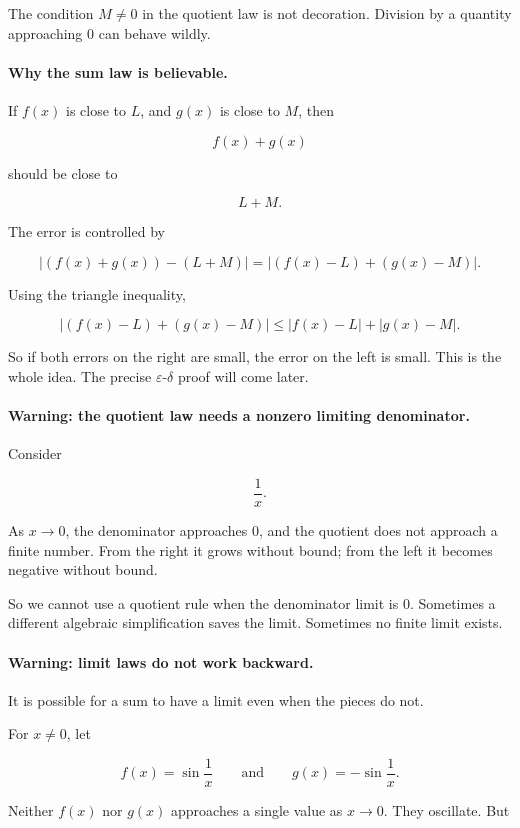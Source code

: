 The condition \(M\neq0\) in the quotient law is not decoration.  Division by a quantity approaching \(0\) can behave wildly.

\paragraph{Why the sum law is believable.}
If \(f(x)\) is close to \(L\), and \(g(x)\) is close to \(M\), then

\[
f(x)+g(x)
\]

should be close to

\[
L+M.
\]

The error is controlled by

\[
\bigl|(f(x)+g(x))-(L+M)\bigr|
=
\bigl|(f(x)-L)+(g(x)-M)\bigr|.
\]

Using the triangle inequality,

\[
\bigl|(f(x)-L)+(g(x)-M)\bigr|
\le
|f(x)-L|+|g(x)-M|.
\]

So if both errors on the right are small, the error on the left is small.  This is the whole idea.  The precise \(\varepsilon\)-\(\delta\) proof will come later.

\paragraph{Warning: the quotient law needs a nonzero limiting denominator.}
Consider

\[
\frac{1}{x}.
\]

As \(x\to0\), the denominator approaches \(0\), and the quotient does not approach a finite number.  From the right it grows without bound; from the left it becomes negative without bound.

So we cannot use a quotient rule when the denominator limit is \(0\).  Sometimes a different algebraic simplification saves the limit.  Sometimes no finite limit exists.

\paragraph{Warning: limit laws do not work backward.}
It is possible for a sum to have a limit even when the pieces do not.

For \(x\neq0\), let

\[
f(x)=\sin\frac1x
\qquad\text{and}\qquad
g(x)=-\sin\frac1x.
\]

Neither \(f(x)\) nor \(g(x)\) approaches a single value as \(x\to0\).  They oscillate.  But

